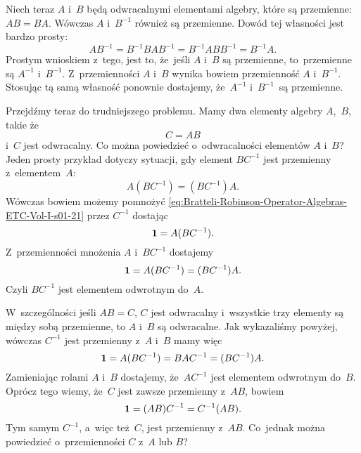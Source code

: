 \documentclass[a4paper,11pt]{article}
\begin{document}
Niech teraz $A$ i~$B$ będą odwracalnymi elementami algebry, które są
przemienne: $A B = B A$. Wówczas $A$ i~$B^{ -1 }$ również są
przemienne. Dowód tej własności jest bardzo prosty:
\begin{equation}
  \label{eq:Bratteli-Robinson-Operator-Algebras-ETC-Vol-I-s01-20}
  A B^{ -1 } = B^{ -1 } B A B^{ -1 } = B^{ -1 } A B B^{ -1 } = B^{ -1 } A.
\end{equation}
Prostym wnioskiem z~tego, jest to, że~jeśli $A$ i~$B$ są przemienne,
to~przemienne są $A^{ -1 }$ i~$B^{ -1 }$. Z~przemienności $A$ i~$B$ wynika
bowiem przemienność $A$ i~$B^{ -1 }$. Stosując tą samą własność ponownie
dostajemy, że~$A^{ -1 }$ i~$B^{ -1 }$~są przemienne.

Przejdźmy teraz do trudniejszego problemu. Mamy dwa elementy algebry
$A$,~$B$, takie że
\begin{equation}
  \label{eq:Bratteli-Robinson-Operator-Algebras-ETC-Vol-I-s01-21}
  C = A B
\end{equation}
i~$C$ jest odwracalny. Co można powiedzieć o~odwracalności elementów $A$
i~$B$? Jeden prosty przykład dotyczy sytuacji, gdy element $B C^{ -1 }$ jest
przemienny z~elementem~$A$:
\begin{equation}
  \label{eq:Bratteli-Robinson-Operator-Algebras-ETC-Vol-I-s01-22}
  A ( B C^{ -1 } ) = ( B C^{ -1 } ) A.
\end{equation}
Wówczas bowiem możemy pomnożyć
\eqref{eq:Bratteli-Robinson-Operator-Algebras-ETC-Vol-I-s01-21} przez
$C^{ -1 }$ dostając
\begin{equation}
  \label{eq:Bratteli-Robinson-Operator-Algebras-ETC-Vol-I-s01-23}
  \mathbf{1} = A ( B C^{ -1 } ).
\end{equation}
Z~przemienności mnożenia $A$ i~$B C^{ -1 }$ dostajemy
\begin{equation}
  \label{eq:Bratteli-Robinson-Operator-Algebras-ETC-Vol-I-s01-24}
  \mathbf{1} = A ( B C^{ -1 } ) = ( B C^{ -1 } ) A.
\end{equation}
Czyli $B C^{ -1 }$ jest elementem odwrotnym do~$A$.

W~szczególności jeśli $A B = C$, $C$ jest odwracalny i~wszystkie trzy
elementy są między sobą przemienne, to $A$ i~$B$ są odwracalne. Jak
wykazaliśmy powyżej, wówczas $C^{ -1 }$ jest przemienny z~$A$ i~$B$ mamy więc
\begin{equation}
  \label{eq:Bratteli-Robinson-Operator-Algebras-ETC-Vol-I-s01-25}
  \mathbf{1} = A ( B C^{ -1 } ) = B A C^{ -1 } = ( B C^{ -1 } ) A.
\end{equation}
Zamieniając rolami $A$ i~$B$ dostajemy, że~$A C^{ -1 }$ jest elementem
odwrotnym do~$B$. Oprócz tego wiemy, że~$C$ jest zawsze przemienny z~$A B$,
bowiem
\begin{equation}
  \label{eq:Bratteli-Robinson-Operator-Algebras-ETC-Vol-I-s01-26}
  \mathbf{1} = ( A B ) C^{ -1 } = C^{ -1 } ( A B ).
\end{equation}
Tym samym $C^{ -1 }$, a~więc też~$C$, jest przemienny z~$A B$. Co~jednak
można powiedzieć o~przemienności $C$ z~$A$ lub $B$?
\end{document}
